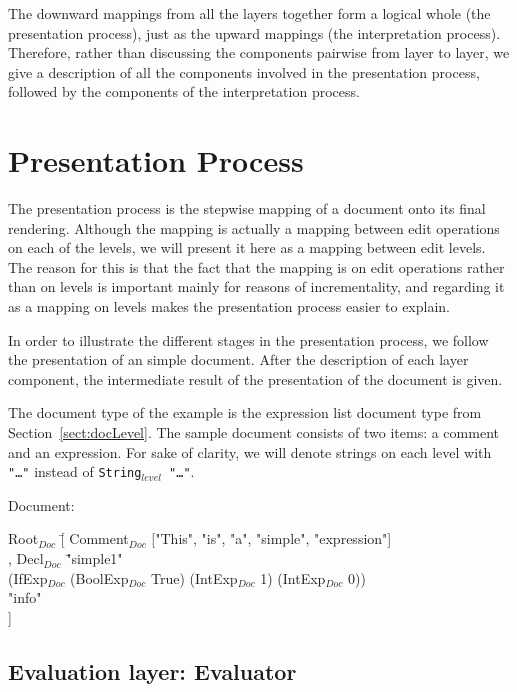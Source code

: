 The downward mappings from all the layers together form a logical whole (the presentation process), just as the upward mappings (the interpretation process). Therefore, rather than discussing the components pairwise from layer to layer, we give a description of all the components involved in the presentation process, followed by the components of the interpretation process.


%																
%																
%																
\section{Presentation Process} \label{sect:presprocess}

The presentation process is the stepwise mapping of a document onto its final rendering. Although the mapping is actually a mapping between edit operations on each of the levels, we will present it here as a mapping between edit levels. The reason for this is that the fact that the mapping is on edit operations rather than on levels is important mainly for reasons of incrementality, and regarding it as a mapping on levels makes the presentation process easier to explain.

In order to illustrate the different stages in the presentation process, we follow the presentation of an simple document. After the description of each layer component, the intermediate result of the presentation of the document is given.

The document type of the example is the expression list document type from Section~\ref{sect:docLevel}. The sample document consists of two items: a comment and an expression. For sake of clarity, we will denote strings on each level with {\tt "\dots"} instead of {\tt String$_{level}$ "\dots"}. 

Document:
\small \ttfamily
\begin{tabbing}
Root$_{Doc}$ \= [ Comment$_{Doc}$ ["This", "is", "a", "simple", "expression"] \\
       \> , Decl$_{Doc}$ \= "simple1" \\
       \>                        \>(IfExp$_{Doc}$ (BoolExp$_{Doc}$ True) (IntExp$_{Doc}$ 1) (IntExp$_{Doc}$ 0))\\
       \>                        \> "info"\\
       \> ] 
\end{tabbing}
\rmfamily \normalsize


%																
\subsection{Evaluation layer: Evaluator} \label{sect:evaluator}

